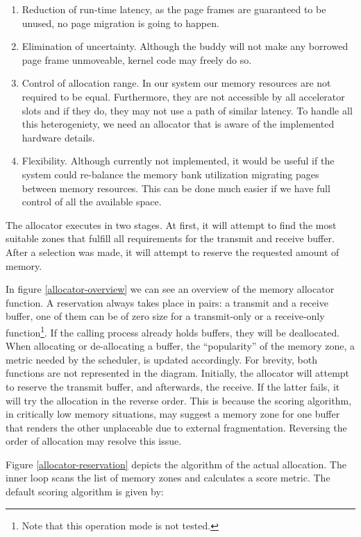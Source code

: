\begin{enumerate}
\item	Reduction of run-time latency, as the page frames are guaranteed to be unused,
	no page migration is going to happen.
\item	Elimination of uncertainty. Although the \gls{buddy} will not make any
	borrowed page frame unmoveable, kernel code may freely do so.
\item	Control of allocation range. In our system our memory resources are not
	required to be equal. Furthermore, they are not accessible by all 
	accelerator slots and if they do, they may not use a path of similar latency.
	To handle all this heterogeniety, we need an allocator that is aware
	of the implemented hardware details.
\item	Flexibility. Although currently not implemented, it would be useful if
	the system could re-balance the memory bank utilization migrating pages
	between memory resources. This can be done much easier if we have full
	control of all the available space.
\end{enumerate}

The allocator executes in two stages. At first, it will attempt to find the most suitable zones that
fulfill all requirements for the transmit and receive buffer. After a selection was made, it will
attempt to reserve the requested amount of memory. 

In figure \ref{allocator-overview} we can see an overview of the memory allocator function.
A reservation always takes place in pairs: a transmit and a receive buffer, one of them can be of zero size
for a transmit-only or a receive-only function\footnote{Note that this operation mode is not tested.}.
If the calling process already holds buffers, they will be deallocated. When allocating or de-allocating
a buffer, the ``popularity'' of the memory zone, a metric needed by the scheduler, is updated accordingly.
For brevity, both functions are not represented in the diagram. Initially, the allocator will attempt
to reserve the transmit buffer, and afterwards, the receive. If the latter fails, it will try the allocation
in the reverse order. This is because the scoring algorithm, in critically low memory situations, may suggest a
memory zone for one buffer that renders the other unplaceable due to external fragmentation. Reversing the order
of allocation may resolve this issue.

Figure \ref{allocator-reservation} depicts the algorithm of the actual allocation. 
The inner loop scans the list of memory zones and calculates a score metric.
The default scoring algorithm is given by:


